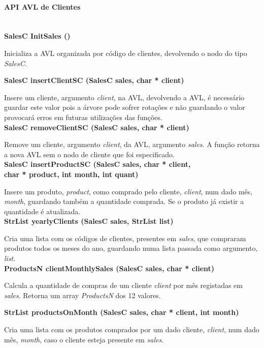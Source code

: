 \documentclass[10pt] {article}
\begin{document}
\paragraph{API AVL de Clientes}\mbox{}\\
\noindent \textbf {SalesC InitSales ()}
\par Inicializa a AVL organizada por código de clientes, devolvendo o nodo do tipo \emph{SalesC}.

\noindent \textbf {SalesC insertClientSC (SalesC sales, char * client)}
\par Insere um cliente, argumento \emph{client}, na AVL, devolvendo a AVL, é necessário guardar este valor
pois a árvore pode sofrer rotações e não guardando o valor provocará erros em futuras utilizações das funções. \\

\noindent \textbf {SalesC removeClientSC (SalesC sales, char * client)}
\par Remove um cliente, argumento \emph{client}, da AVL, argumento \emph{sales}. A função retorna a nova AVL 
sem o nodo de cliente que foi especificado. \\

\noindent \textbf {SalesC insertProductSC (SalesC sales, char * client, \\ char * product, int month, int quant)}
\par Insere um produto, \emph{product}, como comprado pelo cliente, \emph{client}, num dado mês, \emph{month}, 
guardando também a quantidade comprada. Se o produto já existir a quantidade é atualizada. \\

\noindent \textbf {StrList yearlyClients (SalesC sales, StrList list)}
\par Cria uma lista com os códigos de clientes, presentes em \emph{sales}, que compraram produtos todos os 
meses do ano, guardando numa lista passada como argumento, \emph{list}. \\

\noindent \textbf {ProductsN clientMonthlySales (SalesC sales, char * client)}
\par Calcula a quantidade de compras de um cliente \emph{client} por mês registadas em \emph{sales}. Retorna um array \emph{ProductsN} dos 12 valores.  

\noindent \textbf {StrList productsOnMonth (SalesC sales, char * client, int month)}
\par Cria uma lista com os produtos comprados por um dado cliente, \emph{client}, num dado mês, \emph{month}, 
caso o cliente esteja presente em \emph{sales}. \\
\end{document}
